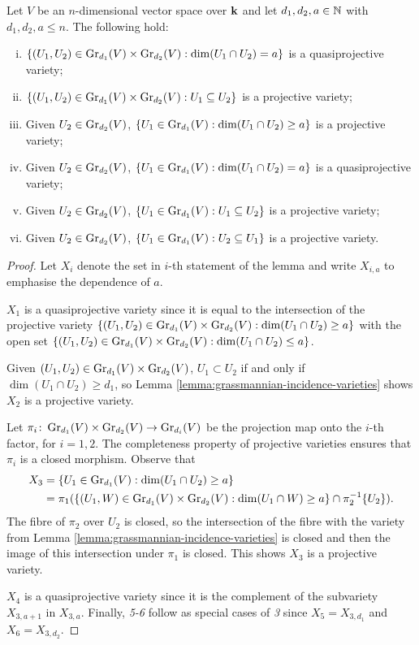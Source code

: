 \documentclass[a4paper, 11pt, twoside]{report}
\begin{document}
\begin{lemma}\label{lemma:grassmannian-incidence-lemmas}
Let $V$ be an $n$-dimensional vector space over $\field$ and let $d_1,d_2,a\in\naturals$ with $d_1,d_2,a\le n$. The following hold:
\begin{enumerate}[i.]
\item
$\{(U_1,U_2)\in\GR[d_1]{V}\times\GR[d_2]{V}: \dim(U_1\cap U_2) = a\}$ is a quasiprojective variety;
\item
$\{(U_1,U_2)\in\GR[d_1]{V}\times\GR[d_2]{V}: U_1\subset U_2\}$ is a projective variety;
\item
Given $U_2\in\GR[d_2]{V}$, $\{U_1\in\GR[d_1]{V}: \dim(U_1\cap U_2)\geq a\}$ is a projective variety;
\item
Given $U_2\in\GR[d_2]{V}$, $\{U_1\in\GR[d_1]{V}:\dim(U_1\cap U_2) = a\}$ is a quasiprojective variety;
\item
Given $U_2\in\GR[d_2]{V}$, $\{U_1\in\GR[d_1]{V}: U_1\subset U_2\}$ is a projective variety;
\item
Given $U_2\in\GR[d_2]{V}$, $\{U_1\in\GR[d_1]{V}: U_2\subset U_1\}$ is a projective variety.
\end{enumerate}
\end{lemma}

\begin{proof}
Let $X_i$ denote the set in $i$-th statement of the lemma and write $X_{i,a}$ to emphasise the dependence of $a$.

$X_1$ is a quasiprojective variety since it is equal to the intersection of the projective variety $\{(U_1,U_2)\in\GR[d_1]{V}\times\GR[d_2]{V}: \dim(U_1\cap U_2)\geq a\}$ with the open set $\{(U_1,U_2)\in\GR[d_1]{V}\times\GR[d_2]{V}: \dim(U_1\cap U_2)\le a\}$.

Given $(U_1,U_2)\in\GR[d_1]{V}\times\GR[d_2]{V}$, $U_1\subset U_2$ if and only if $\dim(U_1\cap U_2)\geq d_1$, so Lemma \ref{lemma:grassmannian-incidence-varieties} shows $X_2$ is a projective variety.

Let $\pi_i\colon\GR[d_1]{V}\times\GR[d_2]{V}\to\GR[d_i]{V}$ be the projection map onto the $i$-th factor, for $i=1,2$. The completeness property of projective varieties ensures that $\pi_i$ is a closed morphism. Observe that
\begin{align*}
X_3 
&= \{U_1\in\GR[d_1]{V}:\dim(U_1\cap U_2)\geq a\}\\
&= \pi_1(\{(U_1,W)\in\GR[d_1]{V}\times\GR[d_2]{V}: \dim(U_1\cap W)\geq a\}\cap\pi_2^{-1}\{U_2\}).
\end{align*}
The fibre of $\pi_2$ over $U_2$ is closed, so the intersection of the fibre with the variety from Lemma \ref{lemma:grassmannian-incidence-varieties} is closed and then the image of this intersection under $\pi_1$ is closed. This shows $X_3$ is a projective variety.

$X_4$ is a quasiprojective variety since it is the complement of the subvariety $X_{3,a+1}$ in $X_{3,a}$. Finally, \emph{5-6} follow as special cases of \emph{3} since $X_5 = X_{3,d_1}$ and $X_6 = X_{3,d_2}$.
\end{proof}
\end{document}
